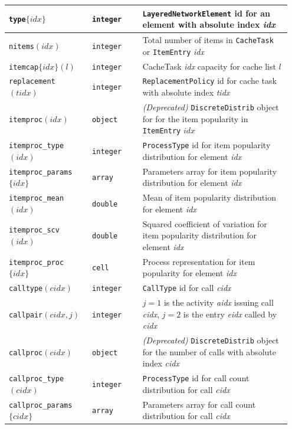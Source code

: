 \begin{MATLAB}
{\begin{longtable}{|p{0.28\linewidth}|p{0.17\linewidth}|p{0.50\linewidth}|}
 \texttt{type}$\{idx\}$ & \texttt{integer} & \texttt{LayeredNetworkElement} id for an element with absolute index \textit{idx} \\\hline
\texttt{nitems}$(idx)$ & \texttt{integer} & Total number of items in \texttt{CacheTask} or \texttt{ItemEntry} \textit{idx} \\\hline
\texttt{itemcap}$\{idx\}(l)$ & \texttt{integer} & CacheTask \textit{idx} capacity for cache list $l$ \\\hline
\texttt{replacement}$(tidx)$ & \texttt{integer} & \texttt{ReplacementPolicy} id for cache task with absolute index \textit{tidx} \\\hline
\texttt{itemproc}$(idx)$ & \texttt{object} & \textit{(Deprecated)} \texttt{DiscreteDistrib} object for for the item popularity in \texttt{ItemEntry} $idx$\\\hline
\texttt{itemproc\_type}$(idx)$ & \texttt{integer} & \texttt{ProcessType} id for item popularity distribution for element \textit{idx} \\\hline
\texttt{itemproc\_params}$\{idx\}$ & \texttt{array} & Parameters array for item popularity distribution for element \textit{idx} \\\hline
\texttt{itemproc\_mean}$(idx)$ & \texttt{double} & Mean of item popularity distribution for element \textit{idx} \\\hline
\texttt{itemproc\_scv}$(idx)$ & \texttt{double} & Squared coefficient of variation for item popularity distribution for element \textit{idx} \\\hline
\texttt{itemproc\_proc}$\{idx\}$ & \texttt{cell} & Process representation for item popularity for element \textit{idx} \\\hline
\texttt{calltype}$(cidx)$ & \texttt{integer} & \texttt{CallType} id for call \textit{cidx}\\\hline
\texttt{callpair}$(cidx,j)$ & \texttt{integer} & $j=1$ is the activity \textit{aidx} issuing call \textit{cidx}, $j=2$ is the entry \textit{eidx} called by \textit{cidx} \\\hline
\texttt{callproc}$(cidx)$ & \texttt{object} & \textit{(Deprecated)} \texttt{DiscreteDistrib} object for the number of calls with absolute index \textit{cidx}\\\hline
\texttt{callproc\_type}$(cidx)$ & \texttt{integer} & \texttt{ProcessType} id for call count distribution for call \textit{cidx} \\\hline
\texttt{callproc\_params}$\{cidx\}$ & \texttt{array} & Parameters array for call count distribution for call \textit{cidx} \\\hline

\end{longtable}}
\end{MATLAB}
